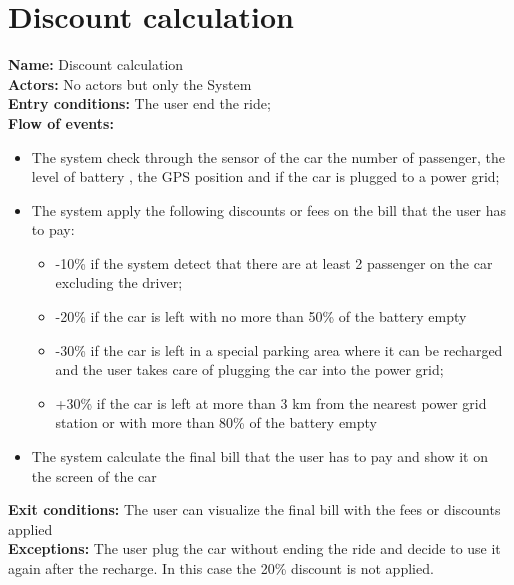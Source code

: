 \section*{Discount calculation}
\textbf{Name:} Discount calculation\\
\textbf{Actors:} No actors but only the System\\
\textbf{Entry conditions:} The user end the ride;\\
\textbf{Flow of events:}
\begin{itemize}
\item The system check through the sensor of the car the number of passenger, the level of battery , the GPS position and if the car is plugged to a power grid;
\item The system apply the following discounts or fees on the bill that the user has to pay:
\begin{itemize}
\item -10\% if the system detect that there are at least 2 passenger on the car excluding the driver;
\item -20\% if the car is left with no more than 50\% of the battery empty
\item -30\% if the car is left in a special parking area where it can be recharged and the user takes care of plugging the car into the power grid;
\item +30\% if the car is left at more than 3 km from the nearest power grid station or with more than 80\% of the battery empty
\end{itemize}
\item The system calculate the final bill that the user has to pay and show it on the screen of the car
\end{itemize}
\textbf{Exit conditions:} The user can visualize the final bill with the fees or discounts applied \\
\textbf{Exceptions:} The user plug the car without ending the ride and decide to use it again after the recharge. In this case the 20\% discount is not applied. \\

